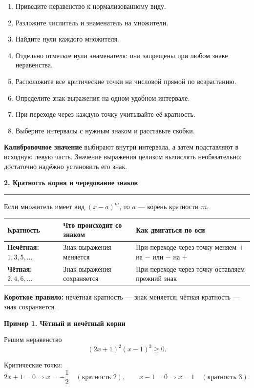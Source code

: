 \documentclass[a4paper,12pt]{article}
\newcommand{\sectiontitle}[1]{%
  \vspace{0.65em}
  {\Large\bfseries\textcolor{darkaccent}{#1}}\par
  \vspace{0.25em}
  {\color{accent}\rule{\linewidth}{0.5pt}}
  \vspace{0.45em}
}
\newcommand{\subsectiontitle}[1]{%
  \vspace{0.5em}
  {\large\bfseries\textcolor{darkaccent}{#1}}\par
  \vspace{0.2em}
}
\newcommand{\important}[1]{\textbf{\textcolor{darkaccent}{#1}}}
\begin{document}
\begin{enumerate}
  \item Приведите неравенство к нормализованному виду.
  \item Разложите числитель и знаменатель на множители.
  \item Найдите нули каждого множителя.
  \item Отдельно отметьте нули знаменателя: они запрещены при любом знаке неравенства.
  \item Расположите все критические точки на числовой прямой по возрастанию.
  \item Определите знак выражения на одном удобном интервале.
  \item При переходе через каждую точку учитывайте её кратность.
  \item Выберите интервалы с нужным знаком и расставьте скобки.
\end{enumerate}

\important{Калибровочное значение} выбирают внутри интервала, а затем подставляют в исходную левую часть. Значение выражения целиком вычислять необязательно: достаточно надёжно установить его знак.

\sectiontitle{2. Кратность корня и чередование знаков}

Если множитель имеет вид $(x-a)^m$, то $a$ --- корень кратности $m$.

\begin{center}
\renewcommand{\arraystretch}{1.4}
\begin{tabularx}{\linewidth}{@{}>{\bfseries}l X X@{}}
\toprule
Кратность & Что происходит со знаком & Как двигаться по оси \\
\midrule
Нечётная: $1,3,5,\ldots$ & Знак выражения меняется & При переходе через точку меняем $+$ на $-$ или $-$ на $+$ \\
Чётная: $2,4,6,\ldots$ & Знак выражения сохраняется & При переходе через точку оставляем прежний знак \\
\bottomrule
\end{tabularx}
\end{center}

\important{Короткое правило:} нечётная кратность --- знак меняется; чётная кратность --- знак сохраняется.

\subsectiontitle{Пример 1. Чётный и нечётный корни}

Решим неравенство
\[
(2x+1)^2(x-1)^3\ge 0.
\]

Критические точки:
\[
2x+1=0 \Rightarrow x=-\frac12 \quad (\text{кратность }2),
\qquad
x-1=0 \Rightarrow x=1 \quad (\text{кратность }3).
\]
\end{document}
